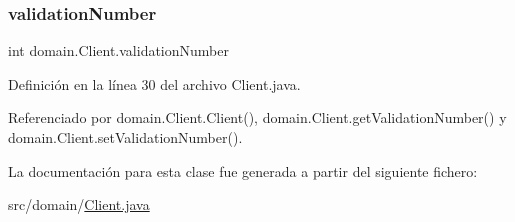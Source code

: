 \mbox{\label{classdomain_1_1_client_a1127a9cdf4d8ccff666bec1c9db31e95}} 
\subsubsection{\texorpdfstring{validationNumber}{validationNumber}}
{\footnotesize\ttfamily int domain.\+Client.\+validation\+Number\hspace{0.3cm}{\ttfamily [private]}}



Definición en la línea 30 del archivo Client.\+java.



Referenciado por domain.\+Client.\+Client(), domain.\+Client.\+get\+Validation\+Number() y domain.\+Client.\+set\+Validation\+Number().



La documentación para esta clase fue generada a partir del siguiente fichero\+:\begin{DoxyCompactItemize}
\item 
src/domain/\mbox{\hyperlink{_client_8java}{Client.\+java}}\end{DoxyCompactItemize}

